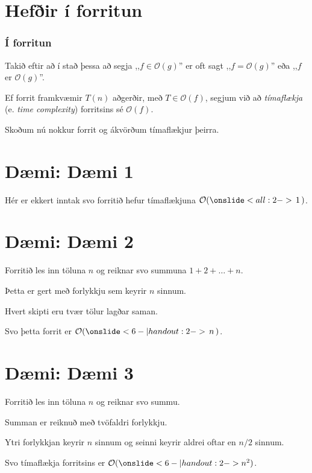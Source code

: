 \section{Hefðir í forritun}
{
    \frametitle{Í forritun}
    {
        \item<1-> Takið eftir að í stað þessa að segja ,,$f \in \mathcal{O}(g)$'' er oft sagt ,,$f = \mathcal{O}(g)$'' eða ,,$f$ er $\mathcal{O}(g)$''.
        \item<2-> Ef forrit framkvæmir $T(n)$ aðgerðir, með $T \in \mathcal{O}(f)$,
            segjum við að \emph{tímaflækja} (e. \emph{time complexity}) forritsins sé $\mathcal{O}(f)$.
        \item<3-> Skoðum nú nokkur forrit og ákvörðum tímaflækjur þeirra.
    }
}

\section{Dæmi: Dæmi 1}
{
    {
        \item<2-> Hér er ekkert inntak svo forritið hefur tímaflækjuna $\mathcal{O}(\onslide<all:2->{\,1\,})$.
    }
}

\section{Dæmi: Dæmi 2}
{
    {
        \item<2-> Forritið les inn töluna $n$ og reiknar svo summuna $1 + 2 + \dots + n$.
        \item<3-> Þetta er gert með forlykkju sem keyrir $n$ sinnum.
        \item<4-> Hvert skipti eru tvær tölur lagðar saman.
        \item<5-> Svo þetta forrit er $\mathcal{O}(\onslide<6- | handout:2->{\,n\,})$.
    }
}

\section{Dæmi: Dæmi 3}
{
    {
        \item<2-> Forritið les inn töluna $n$ og reiknar svo summu.
        \item<3-> Summan er reiknuð með tvöfaldri forlykkju.
        \item<4-> Ytri forlykkjan keyrir $n$ sinnum og seinni keyrir aldrei oftar en $n/2$ sinnum.
        \item<5-> Svo tímaflækja forritsins er $\mathcal{O}(\onslide<6- | handout:2->{n^2})$.
    }
}

